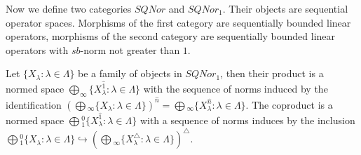 \documentclass[a0b,landscape]{a0poster}
\begin{document}
\begin{multicols}{4}
Now we define two categories $SQNor$ and $SQNor_1$. Their objects are sequential operator spaces. Morphisms of the first category are sequentially bounded linear operators,
morphisms of the second category are sequentially bounded linear operators with $sb$-norm not greater than $1$.

Let $\{X_ \lambda : \lambda \in \Lambda\}$ be a family of objects in $SQNor_1$, then their product is a normed space
$\bigoplus_\infty\{X_ \lambda ^{\widehat{1}}: \lambda \in \Lambda\}$ with the sequence of norms induced by the identification 
$\left(\bigoplus{}_\infty\{X_ \lambda : \lambda  \in \Lambda\}\right)^{\widehat{n}} =\bigoplus{}_\infty\{X_ \lambda ^{\widehat{n}}: \lambda \in \Lambda\}$. 
The coproduct is a normed space $\bigoplus{}_1^0\{X_ \lambda ^{\widehat{1}}: \lambda \in \Lambda\}$ with a sequence of norms induces by the inclusion 
$\bigoplus{}_1^0\{X_ \lambda : \lambda  \in \Lambda\}\hookrightarrow \left(\bigoplus{}_\infty\{X_ \lambda ^\triangle: \lambda \in \Lambda\}\right)^\triangle.$


\end{multicols}
\end{document}
